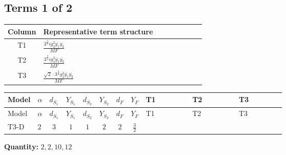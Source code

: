 \documentclass[8pt]{article}
\begin{document}
\begin{landscape}
\subsection*{Terms 1 of 2}
\begin{center}
\begin{tabular}{@{}c >{\raggedright\arraybackslash}p{0.82\linewidth}@{}}
\toprule
Column & Representative term structure \\
\midrule
T1 & \(\displaystyle \frac{3^{\frac{3}{4}} i g_{2}^{2} \overline{y_{1}} \overline{y_{2}}}{MF}\) \\
\midrule
T2 & \(\displaystyle \frac{3^{\frac{3}{4}} i g_{1}^{2} \overline{y_{1}} \overline{y_{2}}}{MF}\) \\
\midrule
T3 & \(\displaystyle \frac{\sqrt{2} \cdot 3^{\frac{3}{4}} g_{2}^{2} \overline{y_{1}} \overline{y_{2}}}{MF}\) \\
\midrule
\bottomrule
\end{tabular}
\end{center}
\smallskip
\tiny
\begin{longtable}{@{}llcccccc >{\raggedright\arraybackslash}p{0.21\linewidth} >{\raggedright\arraybackslash}p{0.21\linewidth} >{\raggedright\arraybackslash}p{0.21\linewidth}@{}}
\toprule
Model & $\alpha$ & $d_{S_1}$ & $Y_{S_1}$ & $d_{S_2}$ & $Y_{S_2}$ & $d_F$ & $Y_F$ & T1 & T2 & T3 \\
\midrule
\endfirsthead
\toprule
Model & $\alpha$ & $d_{S_1}$ & $Y_{S_1}$ & $d_{S_2}$ & $Y_{S_2}$ & $d_F$ & $Y_F$ & T1 & T2 & T3 \\
\midrule
\endhead
T3-D & $2$ & $3$ & $1$ & $1$ & $2$ & $2$ & $\frac{3}{2}$ & \scriptsize\adjustbox{max width=\linewidth}{$\begin{gathered} - \frac{17 \cdot 3^{\frac{3}{4}} i g_{2}^{2} \overline{y_{1}} \overline{y_{2}}}{24 MF}\end{gathered}$} & \scriptsize\adjustbox{max width=\linewidth}{$\begin{gathered} - \frac{9 \cdot 3^{\frac{3}{4}} i g_{1}^{2} \overline{y_{1}} \overline{y_{2}}}{8 MF}\end{gathered}$} & \scriptsize\adjustbox{max width=\linewidth}{$\begin{gathered} - \frac{\sqrt{2} \cdot 3^{\frac{3}{4}} g_{2}^{2} \overline{y_{1}} \overline{y_{2}}}{3 MF}\end{gathered}$} \\
\midrule
\bottomrule
\end{longtable}
\clearpage
\noindent\textbf{Quantity: }$\mathrm{2,2,10,12}$\par\smallskip

\end{landscape}
\end{document}

